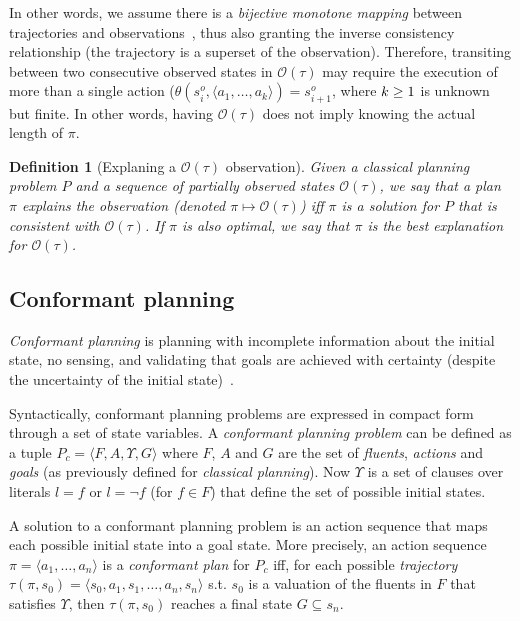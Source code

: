 \documentclass{article}
\newcommand{\tup}[1]{{\langle #1 \rangle}}
\newtheorem{definition}[theorem]{Definition}
\begin{document}
\newpage

In other words, we assume there is a {\em bijective monotone mapping} between trajectories and observations~\cite{ramirez2009plan}, thus also granting the inverse consistency relationship (the trajectory is a superset of the observation). Therefore, transiting between two consecutive observed states in $\mathcal{O}(\tau)$ may require the execution of more than a single action ($\theta(s_i^o,\tup{a_1,\ldots,a_k})=s_{i+1}^o$, where ${\small k\geq 1}$ is unknown but finite. In other words, having $\mathcal{O}(\tau)$ does not imply knowing the actual length of $\pi$.

\begin{definition}[Explaning a $\mathcal{O}(\tau)$ observation]
Given a {\em classical planning problem} $P$ and a sequence of partially observed states $\mathcal{O}(\tau)$, we say that a plan $\pi$ {\em explains the observation} (denoted $\pi\mapsto\mathcal{O}(\tau)$) iff $\pi$ is a solution for $P$ that is consistent with $\mathcal{O}(\tau)$. If $\pi$ is also optimal, we say that $\pi$ is the {\em best explanation} for $\mathcal{O}(\tau)$. 
\end{definition}

\subsection{Conformant planning}
{\em Conformant planning} is planning with incomplete information about the initial state, no sensing, and validating that goals are achieved with certainty (despite the uncertainty of the initial state)~\cite{goldman1996expressive,smith1998conformant,bonet2000planning}.

Syntactically, conformant planning problems are expressed in compact form through a set of state variables. A {\em conformant planning problem} can be defined as a tuple $P_c=\tup{F,A,\Upsilon,G}$ where $F$, $A$ and $G$ are the set of {\em fluents}, {\em actions} and {\em goals} (as previously defined for {\em classical planning}). Now $\Upsilon$ is a set of clauses over literals $l=f$ or $l=\neg f$ (for $f\in F$) that define the set of possible initial states. 

A solution to a conformant planning problem is an action sequence that maps each possible initial state into a goal state. More precisely, an action sequence $\pi=\tup{a_1, \ldots, a_n}$ is a {\em conformant plan} for $P_c$ iff, for each possible {\em trajectory} $\tau(\pi,s_0)=\tup{s_0, a_1, s_1, \ldots, a_n, s_n}$ s.t. $s_0$ is a valuation of the fluents in $F$ that satisfies $\Upsilon$, then $\tau(\pi,s_0)$ reaches a final state $G \subseteq s_n$.
\end{document}
